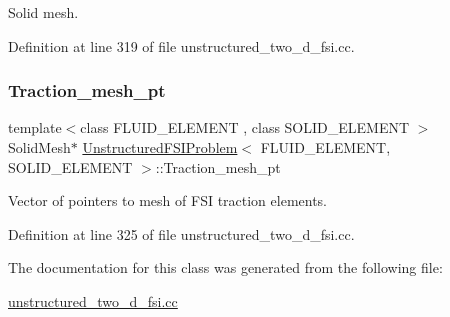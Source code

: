 Solid mesh. 



Definition at line 319 of file unstructured\+\_\+two\+\_\+d\+\_\+fsi.\+cc.

\mbox{\label{classUnstructuredFSIProblem_ab7ada68f864e990b7b5e40000c289aa1}} 
\subsubsection{\texorpdfstring{Traction\+\_\+mesh\+\_\+pt}{Traction\_mesh\_pt}}
{\footnotesize\ttfamily template$<$class F\+L\+U\+I\+D\+\_\+\+E\+L\+E\+M\+E\+NT , class S\+O\+L\+I\+D\+\_\+\+E\+L\+E\+M\+E\+NT $>$ \\
Solid\+Mesh$\ast$ \hyperlink{classUnstructuredFSIProblem}{Unstructured\+F\+S\+I\+Problem}$<$ F\+L\+U\+I\+D\+\_\+\+E\+L\+E\+M\+E\+NT, S\+O\+L\+I\+D\+\_\+\+E\+L\+E\+M\+E\+NT $>$\+::Traction\+\_\+mesh\+\_\+pt\hspace{0.3cm}{\ttfamily [private]}}



Vector of pointers to mesh of F\+SI traction elements. 



Definition at line 325 of file unstructured\+\_\+two\+\_\+d\+\_\+fsi.\+cc.



The documentation for this class was generated from the following file\+:\begin{DoxyCompactItemize}
\item 
\hyperlink{unstructured__two__d__fsi_8cc}{unstructured\+\_\+two\+\_\+d\+\_\+fsi.\+cc}\end{DoxyCompactItemize}

